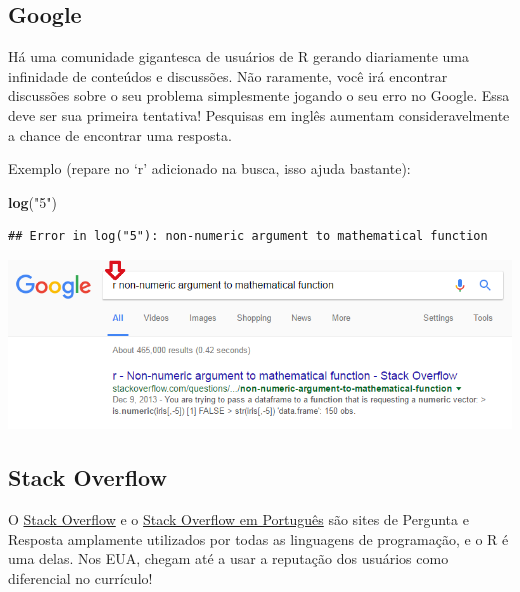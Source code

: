 \documentclass[
]{book}
\newenvironment{Shaded}{\begin{snugshade}}{\end{snugshade}}
\newcommand{\KeywordTok}[1]{\textcolor[rgb]{0.13,0.29,0.53}{\textbf{#1}}}
\newcommand{\NormalTok}[1]{#1}
\newcommand{\StringTok}[1]{\textcolor[rgb]{0.31,0.60,0.02}{#1}}
\begin{document}
\hypertarget{google}{%
\subsection{Google}\label{google}}

Há uma comunidade gigantesca de usuários de R gerando diariamente uma infinidade de conteúdos e discussões. Não raramente, você irá encontrar discussões sobre o seu problema simplesmente jogando o seu erro no Google. Essa deve ser sua primeira tentativa! Pesquisas em inglês aumentam consideravelmente a chance de encontrar uma resposta.

Exemplo (repare no `r' adicionado na busca, isso ajuda bastante):

\begin{Shaded}
\begin{Highlighting}[]
\KeywordTok{log}\NormalTok{(}\StringTok{"5"}\NormalTok{)}
\end{Highlighting}
\end{Shaded}

\begin{verbatim}
## Error in log("5"): non-numeric argument to mathematical function
\end{verbatim}

\begin{center}\includegraphics[width=11.04in]{img/r-base/ajuda_google} \end{center}

\hypertarget{stack-overflow}{%
\subsection{Stack Overflow}\label{stack-overflow}}

O \href{http://stackoverflow.com/}{Stack Overflow} e o \href{http://pt.stackoverflow.com/}{Stack Overflow em Português} são sites de Pergunta e Resposta amplamente utilizados por todas as linguagens de programação, e o R é uma delas. Nos EUA, chegam até a usar a reputação dos usuários como diferencial no currículo!
\end{document}
